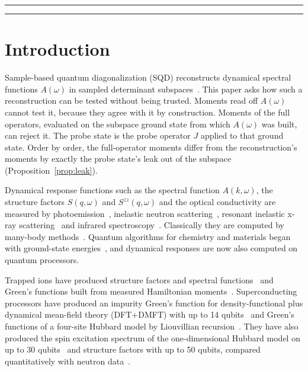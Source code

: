 \documentclass[submission, PhysCore]{SciPost}
\begin{document}
\vspace{10pt}
\noindent\rule{\textwidth}{1pt}
\tableofcontents\thispagestyle{fancy}
\noindent\rule{\textwidth}{1pt}
\vspace{10pt}

\section{Introduction}\label{sec:intro}
Sample-based quantum diagonalization (SQD) reconstructs dynamical spectral functions $A(\omega)$ in sampled determinant subspaces~\cite{SQDspec2608,Patel2026}. This paper asks how such a reconstruction can be tested without being trusted. Moments read off $A(\omega)$ cannot test it, because they agree with it by construction. Moments of the full operators, evaluated on the subspace ground state from which $A(\omega)$ was built, can reject it. The probe state is the probe operator $J$ applied to that ground state. Order by order, the full-operator moments differ from the reconstruction's moments by exactly the probe state's leak out of the subspace (Proposition~\ref{prop:leak}).

Dynamical response functions such as the spectral function $A(k,\omega)$, the structure factors $S(q,\omega)$ and $S^{zz}(q,\omega)$ and the optical conductivity are measured by photoemission~\cite{Damascelli2003}, inelastic neutron scattering~\cite{Lake2005}, resonant inelastic x-ray scattering~\cite{Ament2011} and infrared spectroscopy~\cite{Basov2011}. Classically they are computed by many-body methods~\cite{Benthien2004,Qin2022}. Quantum algorithms for chemistry and materials began with ground-state energies~\cite{AspuruGuzik2005,Peruzzo2014,McArdle2020,Bauer2020}, and dynamical responses are now also computed on quantum processors.

Trapped ions have produced structure factors and spectral functions~\cite{GranetDSF2026,GranetARPES2026} and Green's functions built from measured Hamiltonian moments~\cite{GreeneDiniz2024}. Superconducting processors have produced an impurity Green's function for density-functional plus dynamical mean-field theory (DFT+DMFT) with up to 14 qubits~\cite{Selisko2025} and Green's functions of a four-site Hubbard model by Liouvillian recursion~\cite{Leblanc2026}. They have also produced the spin excitation spectrum of the one-dimensional Hubbard model on up to $30$ qubits~\cite{VilchezEstevez2025} and structure factors with up to 50 qubits, compared quantitatively with neutron data~\cite{Lee2026}.
\end{document}
